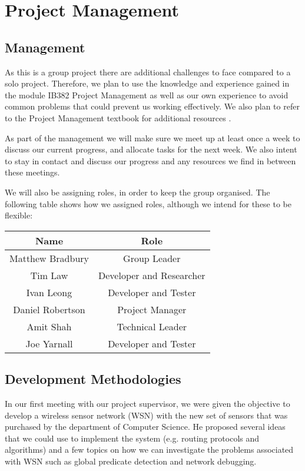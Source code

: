 \documentclass[a4paper]{article}
\begin{document}
\section{Project Management}

\subsection{Management}

As this is a group project there are additional challenges to face compared to a solo project. Therefore, we plan to use the knowledge and experience gained in the module IB382 Project Management \cite{IB382} as well as our own experience to avoid common problems that could prevent us working effectively. We also plan to refer to the Project Management textbook for additional resources \cite{PMTextBook}.

As part of the management we will make sure we meet up at least once a week to discuss our current progress, and allocate tasks for the next week. We also intent to stay in contact and discuss our progress and any resources we find in between these meetings.

We will also be assigning roles, in order to keep the group organised. The following table shows how we assigned roles, although we intend for these to be flexible:

\begin{table}[H]
\centering
	\begin{tabular}{| c | c |}
		\hline
		Name & Role\\
		\hline
		Matthew Bradbury & Group Leader\\
		Tim Law & Developer and Researcher\\
		Ivan Leong & Developer and Tester\\
		Daniel Robertson & Project Manager\\
		Amit Shah & Technical Leader\\
		Joe Yarnall & Developer and Tester\\
		\hline
	\end{tabular}
\end{table}



\subsection{Development Methodologies}
In our first meeting with our project supervisor, we were given the objective to develop a wireless sensor network (WSN) with the new set of sensors that was purchased by the department of Computer Science. He proposed several ideas that we could use to implement the system (e.g. routing protocols and algorithms) and a few topics on how we can investigate the problems associated with WSN such as global predicate detection and network debugging. 
\end{document}
